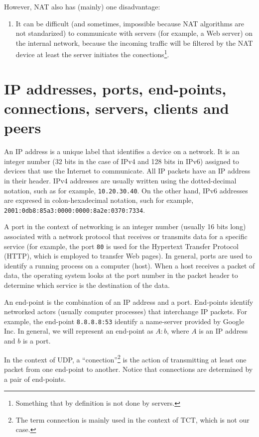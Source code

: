 However, NAT also has (mainly) one disadvantage:
\begin{enumerate}
\item It can be difficult (and sometimes, impossible because NAT
  algorithms are not standarized) to communicate with servers (for
  example, a Web server) on the internal network, because the incoming
  traffic will be filtered by the NAT device at least the server
  initiates the conections\footnote{Something that by definition is
    not done by servers.}.
\end{enumerate}

\section{IP addresses, ports, end-points, connections, servers, clients and peers}

An IP address is a unique label that identifies a device on a
network. It is an integer number (32 bits in the case of IPv4 and 128
bits in IPv6) assigned to devices that use the Internet to
communicate. All IP packets have an IP address in their header. IPv4
addresses are usually written using the dotted-decimal notation, such
as for example, \texttt{10.20.30.40}. On the other hand, IPv6
addresses are expresed in colon-hexadecimal notation, such for
example, \texttt{2001:0db8:85a3:0000:0000:8a2e:0370:7334}.

A port in the context of networking is an integer number (usually 16
bits long) associated with a network protocol that receives or
transmits data for a specific service (for example, the port
\texttt{80} is used for the Hypertext Transfer Protocol (HTTP), which
is employed to transfer Web pages). In general, ports are used to
identify a running process on a computer (host). When a host receives
a packet of data, the operating system looks at the port number in the
packet header to determine which service is the destination of the
data.

An end-point is the combination of an IP address and a
port. End-points identify networked actors (usually computer
processes) that interchange IP packets. For example, the end-point
\texttt{8.8.8.8:53} identify a name-server provided by Google Inc. In
general, we will represent an end-point as $A:b$, where $A$ is an
IP address and $b$ is a port.

In the context of UDP, a ``conection''\footnote{The term connection is
  mainly used in the context of TCT, which is not our case.} is the
action of transmitting at least one packet from one end-point to
another. Notice that connections are determined by a pair of
end-points.

